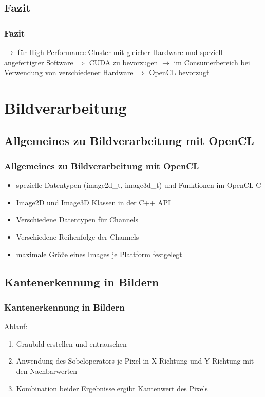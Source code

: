 \documentclass{beamer}
\begin{document}
\subsection{Fazit}
\begin{frame}
\frametitle{Fazit}
$\to$
für High-Performance-Cluster mit gleicher Hardware und speziell angefertigter Software
\newline
$\Rightarrow$
CUDA zu bevorzugen
\newline
\newline
$\to$
im Consumerbereich bei Verwendung von verschiedener Hardware
\newline
$\Rightarrow$
OpenCL bevorzugt
\end{frame}

\section{Bildverarbeitung}

\subsection{Allgemeines zu Bildverarbeitung mit OpenCL}
\begin{frame}
\frametitle{Allgemeines zu Bildverarbeitung mit OpenCL}
\begin{itemize}
\item spezielle Datentypen (image2d\_t, image3d\_t) und Funktionen im OpenCL C
\item Image2D und Image3D Klassen in der C++ API
\item Verschiedene Datentypen für Channels
\item Verschiedene Reihenfolge der Channels
\item maximale Größe eines Images je Plattform festgelegt
\end{itemize}
\end{frame}

\subsection{Kantenerkennung in Bildern}
\begin{frame}
\frametitle{Kantenerkennung in Bildern}
Ablauf:
\begin{enumerate}
\item Graubild erstellen und entrauschen
\item Anwendung des Sobeloperators je Pixel in X-Richtung und Y-Richtung mit den Nachbarwerten
\item Kombination beider Ergebnisse ergibt Kantenwert des Pixels
\end{enumerate}
\end{frame}
\end{document}
